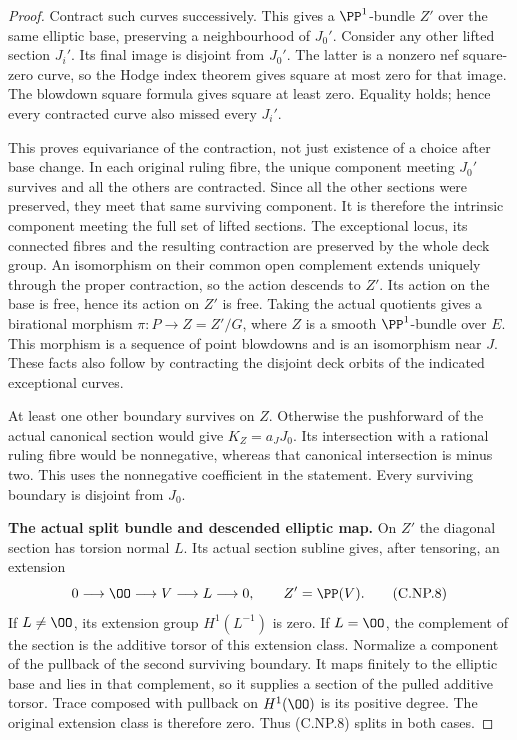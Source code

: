 \begin{proof}
Contract such curves
successively. This gives
a \(\PP^1\)-bundle \(Z'\)
over the same elliptic
base, preserving a
neighbourhood of \(J_0'\).
Consider any other
lifted section \(J_i'\).
Its final image is
disjoint from \(J_0'\).
The latter is a nonzero
nef square-zero curve,
so the Hodge index
theorem gives square
at most zero for that
image. The blowdown
square formula gives
square at least zero.
Equality holds; hence
every contracted curve
also missed every
\(J_i'\).

This proves equivariance
of the contraction, not
just existence of a
choice after base change.
In each original ruling
fibre, the unique component
meeting \(J_0'\) survives
and all the others are
contracted. Since all the
other sections were
preserved, they meet
that same surviving
component. It is
therefore the intrinsic
component meeting the
full set of lifted
sections. The exceptional
locus, its connected
fibres and the resulting
contraction are preserved
by the whole deck group.
An isomorphism on their
common open complement
extends uniquely through
the proper contraction,
so the action descends
to \(Z'\).
Its action on the base
is free, hence its
action on \(Z'\) is
free. Taking the actual
quotients gives a
birational morphism
\(\pi:P\to Z=Z'/G\),
where \(Z\) is a smooth
\(\PP^1\)-bundle over
\(E\). This morphism
is a sequence of point
blowdowns and is an
isomorphism near \(J\).
These facts also follow
by contracting the
disjoint deck orbits
of the indicated
exceptional curves.

At least one other
boundary survives on
\(Z\). Otherwise the
pushforward of the
actual canonical section
would give \(K_Z=a_JJ_0\).
Its intersection with
a rational ruling fibre
would be nonnegative,
whereas that canonical
intersection is minus two.
This uses the
nonnegative coefficient
in the statement.
Every surviving boundary
is disjoint from \(J_0\).

\par\medskip\noindent\textbf{The actual split bundle and descended elliptic map.}
On \(Z'\) the diagonal
section has torsion
normal \(L\). Its actual
section subline gives,
after tensoring, an
extension
\[
           0\longrightarrow\OO
             \longrightarrow V
             \longrightarrow L\longrightarrow0,
                  \qquad Z'=\PP(V).
 \tag{C.NP.8}
\]
If \(L\ne\OO\), its
extension group
\(H^1(L^{-1})\) is zero.
If \(L=\OO\), the
complement of the section
is the additive torsor
of this extension class.
Normalize a component
of the pullback of the
second surviving boundary.
It maps finitely to the
elliptic base and lies
in that complement,
so it supplies a section
of the pulled additive
torsor. Trace composed
with pullback on
\(H^1(\OO)\) is its
positive degree.
The original extension
class is therefore zero.
Thus (C.NP.8) splits
in both cases.


\end{proof}
